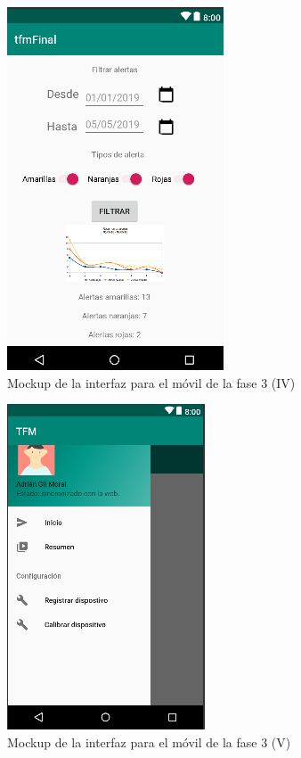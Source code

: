 \begin{figure}[!htbp]
    \centering
    \includegraphics[scale=0.6]{Imagenes/anxA15.png}
    \caption[Mockup de la interfaz para el móvil de la fase 3 (IV)]{Mockup de la interfaz para el móvil de la fase 3 (IV)}
    \label{fig:mockup15}
\end{figure}

\begin{figure}[!htbp]
    \centering
    \includegraphics[scale=0.6]{Imagenes/anxA16.png}
    \caption[Mockup de la interfaz para el móvil de la fase 3 (V)]{Mockup de la interfaz para el móvil de la fase 3 (V)}
    \label{fig:mockup16}
\end{figure}


